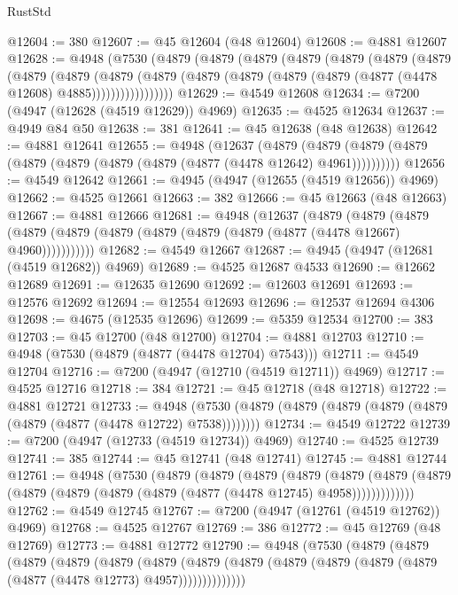 \begin{lexlean}{RustStd}
\begin{coremodule}
{\begin{coremodule}
{{{{{{{{{{{{{{{{{{{{{{{{{{{{{{{{{{{{{{{{{{{{{{{{{{{{{{{{{{{{@12604 := 380
@12607 := @45 @12604 (@48 @12604)
@12608 := @4881 @12607
@12628 := @4948
    (@7530
      (@4879
        (@4879
          (@4879
            (@4879
              (@4879
                (@4879
                  (@4879
                    (@4879
                      (@4879
                        (@4879
                          (@4879
                            (@4879 (@4879 (@4879 (@4879 (@4877 (@4478 @12608) @4885)))))))))))))))))
@12629 := @4549 @12608
@12634 := @7200 (@4947 (@12628 (@4519 @12629)) @4969)
@12635 := @4525 @12634
@12637 := @4949 @84 @50
@12638 := 381
@12641 := @45 @12638 (@48 @12638)
@12642 := @4881 @12641
@12655 := @4948
    (@12637
      (@4879 (@4879 (@4879 (@4879 (@4879 (@4879 (@4879 (@4879 (@4877 (@4478 @12642) @4961))))))))))
@12656 := @4549 @12642
@12661 := @4945 (@4947 (@12655 (@4519 @12656)) @4969)
@12662 := @4525 @12661
@12663 := 382
@12666 := @45 @12663 (@48 @12663)
@12667 := @4881 @12666
@12681 := @4948
    (@12637
      (@4879
        (@4879
          (@4879 (@4879 (@4879 (@4879 (@4879 (@4879 (@4879 (@4877 (@4478 @12667) @4960)))))))))))
@12682 := @4549 @12667
@12687 := @4945 (@4947 (@12681 (@4519 @12682)) @4969)
@12689 := @4525 @12687 @4533
@12690 := @12662 @12689
@12691 := @12635 @12690
@12692 := @12603 @12691
@12693 := @12576 @12692
@12694 := @12554 @12693
@12696 := @12537 @12694 @4306
@12698 := @4675 (@12535 @12696)
@12699 := @5359 @12534
@12700 := 383
@12703 := @45 @12700 (@48 @12700)
@12704 := @4881 @12703
@12710 := @4948 (@7530 (@4879 (@4877 (@4478 @12704) @7543)))
@12711 := @4549 @12704
@12716 := @7200 (@4947 (@12710 (@4519 @12711)) @4969)
@12717 := @4525 @12716
@12718 := 384
@12721 := @45 @12718 (@48 @12718)
@12722 := @4881 @12721
@12733 := @4948 (@7530 (@4879 (@4879 (@4879 (@4879 (@4879 (@4879 (@4877 (@4478 @12722) @7538))))))))
@12734 := @4549 @12722
@12739 := @7200 (@4947 (@12733 (@4519 @12734)) @4969)
@12740 := @4525 @12739
@12741 := 385
@12744 := @45 @12741 (@48 @12741)
@12745 := @4881 @12744
@12761 := @4948
    (@7530
      (@4879
        (@4879
          (@4879
            (@4879
              (@4879
                (@4879 (@4879 (@4879 (@4879 (@4879 (@4879 (@4877 (@4478 @12745) @4958)))))))))))))
@12762 := @4549 @12745
@12767 := @7200 (@4947 (@12761 (@4519 @12762)) @4969)
@12768 := @4525 @12767
@12769 := 386
@12772 := @45 @12769 (@48 @12769)
@12773 := @4881 @12772
@12790 := @4948
    (@7530
      (@4879
        (@4879
          (@4879
            (@4879
              (@4879
                (@4879
                  (@4879
                    (@4879 (@4879 (@4879 (@4879 (@4879 (@4877 (@4478 @12773) @4957))))))))))))))
}}}}}}}}}}}}}}}}}}}}}}}}}}}}}}}}}}}}}}}}}}}}}}}}}}}}}}}}}}}}
\end{coremodule}}
\end{coremodule}
\end{lexlean}
